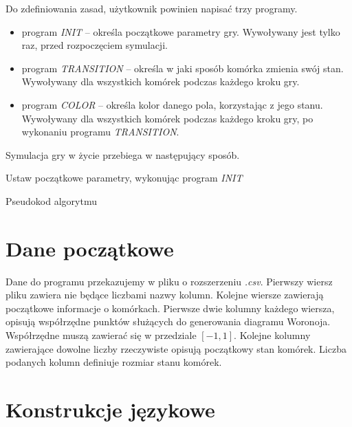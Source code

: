 \documentclass[declaration,shortabstract, inz]{iithesis}
\theoremstyle{definition} \newtheorem{definition}{Definicja}[]
\theoremstyle{plain} \newtheorem{remark}[definition]{Obserwacja}
\theoremstyle{plain} \newtheorem{theorem}[definition]{Twierdzenie}
\theoremstyle{plain} \newtheorem{example}{Przykład}[definition]
\theoremstyle{plain} \newtheorem{lemma}[definition]{Lemat}
\begin{document}
Do zdefiniowania zasad, użytkownik powinien napisać trzy programy. 
\begin{itemize}
\item program \textit{INIT} -- określa początkowe parametry gry. Wywoływany jest tylko raz, przed rozpoczęciem symulacji.
\item program \textit{TRANSITION} -- określa w jaki sposób komórka zmienia swój stan. Wywoływany dla wszystkich komórek podczas każdego kroku gry.
\item program \textit{COLOR} -- określa kolor danego pola, korzystając z jego stanu. Wywoływany dla wszystkich komórek podczas każdego kroku gry, po wykonaniu programu \textit{TRANSITION}.
\end{itemize}

Symulacja gry w życie przebiega w następujący sposób.

\begin{algorithm}[H]
\SetAlgoLined
	Ustaw początkowe parametry, wykonując program \textit{INIT}\\
 \caption{Pseudokod algorytmu}
\end{algorithm}

\section{Dane początkowe}
Dane do programu przekazujemy w pliku o rozszerzeniu \textit{.csv}. Pierwszy wiersz pliku zawiera nie będące liczbami nazwy kolumn. Kolejne wiersze zawierają początkowe informacje o komórkach. Pierwsze dwie kolumny każdego wiersza, opisują współrzędne punktów służących do generowania diagramu Woronoja.  Współrzędne muszą zawierać się w przedziale $[-1, 1]$. Kolejne kolumny zawierające dowolne liczby rzeczywiste opisują początkowy stan komórek. Liczba podanych kolumn definiuje rozmiar stanu komórek.

\section{Konstrukcje językowe}
\end{document}
